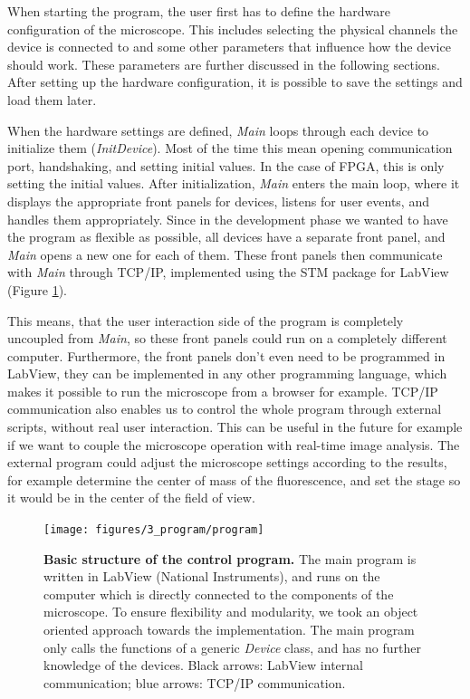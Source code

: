 \documentclass{tdk_style}
\begin{document}
When starting the program, the user first has to define the hardware configuration of the microscope. This includes selecting the physical channels the device is connected to and some other parameters that influence how the device should work. These parameters are further discussed in the following sections. After setting up the hardware configuration, it is possible to save the settings and load them later.

When the hardware settings are defined, \emph{Main} loops through each device to initialize them (\emph{InitDevice}). Most of the time this mean opening communication port, handshaking, and setting initial values. In the case of FPGA, this is only setting the initial values. After initialization, \emph{Main} enters the main loop, where it displays the appropriate front panels for devices, listens for user events, and handles them appropriately. Since in the development phase we wanted to have the program as flexible as possible, all devices have a separate front panel, and \emph{Main} opens a new one for each of them. These front panels then communicate with \emph{Main} through TCP/IP, implemented using the STM package for LabView (Figure \ref{fig:program}).

This means, that the user interaction side of the program is completely uncoupled from \emph{Main}, so these front panels could run on a completely different computer. Furthermore, the front panels don't even need to be programmed in LabView, they can be implemented in any other programming language, which makes it possible to run the microscope from a browser for example. TCP/IP communication also enables us to control the whole program through external scripts, without real user interaction. This can be useful in the future for example if we want to couple the microscope operation with real-time image analysis. The external program could adjust the microscope settings according to the results, for example determine the center of mass of the fluorescence, and set the stage so it would be in the center of the field of view.


\begin{figure}[htpb]
	\centering
	\texttt{[image: figures/3\_program/program]}
	\caption{\textbf{Basic structure of the control program.} The main program is written in LabView (National Instruments), and runs on the computer which is directly connected to the components of the microscope. To ensure flexibility and modularity, we took an object oriented approach towards the implementation. The main program only calls the functions of a generic \emph{Device} class, and has no further knowledge of the devices. Black arrows: LabView internal communication; blue arrows: TCP/IP communication.}
	\label{fig:program}
\end{figure}
\end{document}
